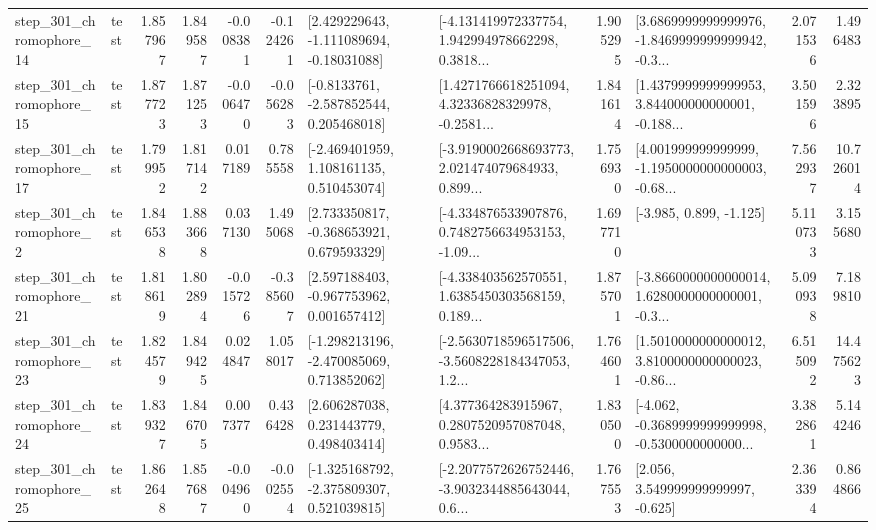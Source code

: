 \begin{tabular}{llrrrrllrlrr}
  step\_301\_chromophore\_14 &      test &      1.857967 &    1.849587 &     -0.008381 & -0.124261 &    [2.429229643, -1.111089694, -0.18031088] &  [-4.131419972337754, 1.942994978662298, 0.3818... &       1.905295 &  [3.6869999999999976, -1.8469999999999942, -0.3... &            2.071536 &          1.496483 \\
  step\_301\_chromophore\_15 &      test &      1.877723 &    1.871253 &     -0.006470 & -0.056283 &     [-0.8133761, -2.587852544, 0.205468018] &  [1.4271766618251094, 4.32336828329978, -0.2581... &       1.841614 &  [1.4379999999999953, 3.844000000000001, -0.188... &            3.501596 &          2.323895 \\
  step\_301\_chromophore\_17 &      test &      1.799952 &    1.817142 &      0.017189 &  0.785558 &    [-2.469401959, 1.108161135, 0.510453074] &  [-3.9190002668693773, 2.021474079684933, 0.899... &       1.756930 &  [4.001999999999999, -1.1950000000000003, -0.68... &            7.562937 &         10.726014 \\
   step\_301\_chromophore\_2 &      test &      1.846538 &    1.883668 &      0.037130 &  1.495068 &    [2.733350817, -0.368653921, 0.679593329] &  [-4.334876533907876, 0.7482756634953153, -1.09... &       1.697710 &                            [-3.985, 0.899, -1.125] &            5.110733 &          3.155680 \\
  step\_301\_chromophore\_21 &      test &      1.818619 &    1.802894 &     -0.015726 & -0.385607 &    [2.597188403, -0.967753962, 0.001657412] &  [-4.338403562570551, 1.6385450303568159, 0.189... &       1.875701 &  [-3.8660000000000014, 1.6280000000000001, -0.3... &            5.090938 &          7.189810 \\
  step\_301\_chromophore\_23 &      test &      1.824579 &    1.849425 &      0.024847 &  1.058017 &   [-1.298213196, -2.470085069, 0.713852062] &  [-2.5630718596517506, -3.5608228184347053, 1.2... &       1.764601 &  [1.5010000000000012, 3.8100000000000023, -0.86... &            6.515092 &         14.475623 \\
  step\_301\_chromophore\_24 &      test &      1.839327 &    1.846705 &      0.007377 &  0.436428 &     [2.606287038, 0.231443779, 0.498403414] &  [4.377364283915967, 0.2807520957087048, 0.9583... &       1.830500 &  [-4.062, -0.3689999999999998, -0.5300000000000... &            3.382861 &          5.144246 \\
  step\_301\_chromophore\_25 &      test &      1.862648 &    1.857687 &     -0.004960 & -0.002554 &   [-1.325168792, -2.375809307, 0.521039815] &  [-2.2077572626752446, -3.9032344885643044, 0.6... &       1.767553 &                 [2.056, 3.549999999999997, -0.625] &            2.363394 &          0.864866 \\

\end{tabular}
